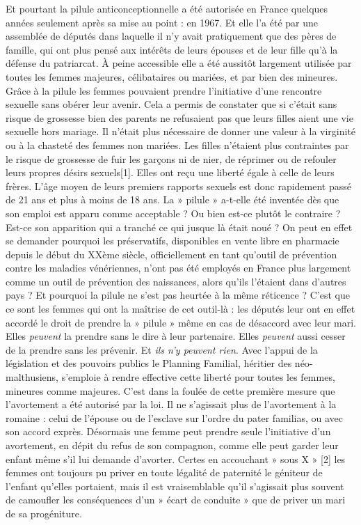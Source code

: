  Et pourtant la pilule anticonceptionnelle a été autorisée en France quelques années seulement après sa mise au point : en 1967. Et elle l'a été par une assemblée de députés dans laquelle il n'y avait pratiquement que des pères de famille, qui ont plus pensé aux intérêts de leurs épouses et de leur fille qu'à la défense du patriarcat. À peine accessible elle a été aussitôt largement utilisée par toutes les femmes majeures, célibataires ou mariées, et par bien des mineures. Grâce à la pilule les femmes pouvaient prendre l'initiative d'une rencontre sexuelle sans obérer leur avenir. Cela a permis de constater que si c'était sans risque de grossesse bien des parents ne refusaient pas que leurs filles aient une vie sexuelle hors mariage. Il n'était plus nécessaire de donner une valeur à la virginité ou à la chasteté des femmes non mariées. Les filles n'étaient plus contraintes par le risque de grossesse de fuir les garçons ni de nier, de réprimer ou de refouler leurs propres désirs sexuels[1]. Elles ont reçu une liberté égale à celle de leurs frères. L'âge moyen de leurs premiers rapports sexuels est donc rapidement passé de 21 ans et plus à moins de 18 ans.
 La » pilule » a-t-elle été inventée dès que son emploi est apparu comme acceptable ? Ou bien est-ce plutôt le contraire ? Est-ce son apparition qui a tranché ce qui jusque là était noué ? On peut en effet se demander pourquoi les préservatifs, disponibles en vente libre en pharmacie depuis le début du XXème siècle, officiellement en tant qu'outil de prévention contre les maladies vénériennes, n'ont pas été employés en France plus largement comme un outil de prévention des naissances, alors qu'ils l'étaient dans d'autres pays ? Et pourquoi la pilule ne s'est pas heurtée à la même réticence ? 
 C'est que ce sont les femmes qui ont la maîtrise de cet outil-là : les députés leur ont en effet accordé le droit de prendre la » pilule » même en cas de désaccord avec leur mari. Elles \emph{peuvent} la prendre sans le dire à leur partenaire. Elles \emph{peuvent} aussi cesser de la prendre sans les prévenir. Et\emph{ ils n'y peuvent rien}. Avec l'appui de la législation et des pouvoirs publics le Planning Familial, héritier des néo-malthusiens, s'emploie à rendre effective cette liberté pour toutes les femmes, mineures comme majeures. 
 C'est dans la foulée de cette première mesure que l'avortement a été autorisé par la loi. Il ne s'agissait plus de l'avortement à la romaine : celui de l'épouse ou de l'esclave sur l'ordre du pater familias, ou avec son accord exprès. Désormais une femme peut prendre seule l'initiative d'un avortement, en dépit du refus de son compagnon, comme elle peut garder leur enfant même s'il lui demande d'avorter. Certes en accouchant » sous X » [2] les femmes ont toujours pu priver en toute légalité de paternité le géniteur de l'enfant qu'elles portaient, mais il est vraisemblable qu'il s'agissait plus souvent de camoufler les conséquences d'un » écart de conduite » que de priver un mari de sa progéniture.
 
